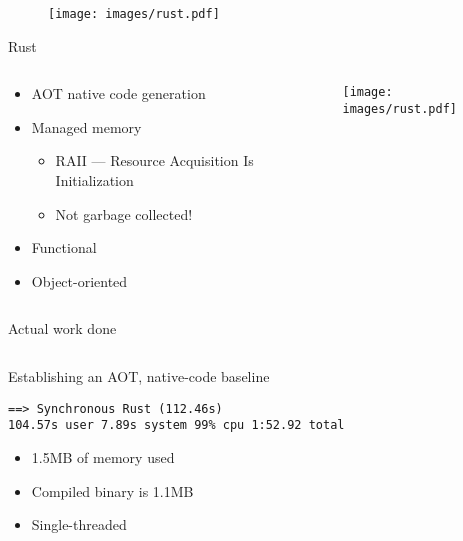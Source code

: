 \documentclass[aspectratio=169,14pt]{beamer}
\begin{document}
\begin{frame}
  \begin{figure}
    \texttt{[image: images/rust.pdf]}
  \end{figure}
\end{frame}


\begin{frame}{Rust}
  \begin{columns}[c]
    \begin{column}{0.6\textwidth}
      \begin{itemize}
      \item AOT native code generation
      \item Managed memory
        \begin{itemize}
          \item RAII --- Resource Acquisition Is Initialization
          \item Not garbage collected!
        \end{itemize}
      \item Functional
      \item Object-oriented
      \end{itemize}
    \end{column}

    \begin{column}{0.4\textwidth}
      \begin{figure}
        \texttt{[image: images/rust.pdf]}
      \end{figure}
    \end{column}
  \end{columns}
\end{frame}


\begin{frame}[fragile]{Actual work done}
  \inputminted{rust}{snippets/handle_line.rs}
\end{frame}


\begin{frame}[fragile]{Establishing an AOT, native-code baseline}
  \begin{verbatim}
==> Synchronous Rust (112.46s)
104.57s user 7.89s system 99% cpu 1:52.92 total
    \end{verbatim}

    \begin{itemize}
      \item 1.5MB of memory used
      \item Compiled binary is 1.1MB
      \item Single-threaded
    \end{itemize}
\end{frame}
\end{document}
